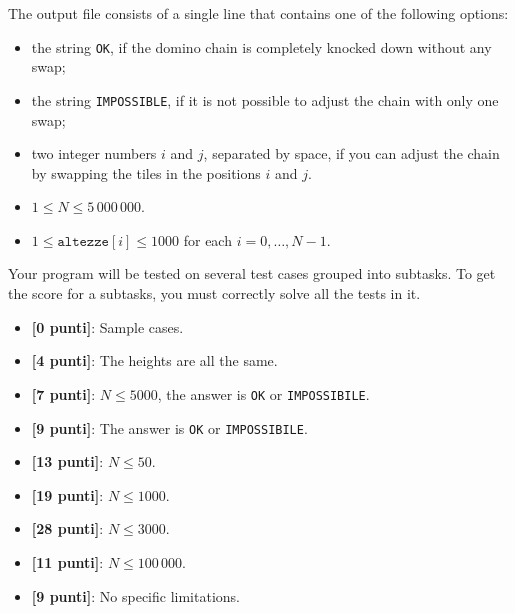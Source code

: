 The output file consists of a single line that contains one of the following options:
\begin{itemize}[nolistsep,itemsep=2mm]
\item the string \texttt{OK}, if the domino chain is completely knocked down without any swap;
\item the string \texttt{IMPOSSIBLE}, if it is not possible to adjust the chain with only one swap;
\item two integer numbers $i$ and $j$, separated by space,
  if you can adjust the chain by swapping the tiles in the positions $i$ and $j$.
\end{itemize}


\pagebreak
\Constraints

\begin{itemize}[nolistsep, itemsep=2mm]
	\item $1 \le N \le 5\,000\,000$.
	\item $1 \le \texttt{altezze}[i] \le 1000$ for each $i=0, \ldots, N-1$.
\end{itemize}



\Scoring

Your program will be tested on several test cases grouped into subtasks.
To get the score for a subtasks, you must correctly solve all the tests in it.

\begin{itemize}[nolistsep,itemsep=2mm]
  \item \textbf{ [\phantom{0}0 punti]}: Sample cases.
  \item \textbf{ [\phantom{0}4 punti]}: The heights are all the same.
  \item \textbf{ [\phantom{0}7 punti]}: $N \le 5000$, the answer is \texttt{OK} or \texttt{IMPOSSIBILE}.
  \item \textbf{ [\phantom{0}9 punti]}: The answer is \texttt{OK} or \texttt{IMPOSSIBILE}.
  \item \textbf{ [13 punti]}: $N \leq 50$.
  \item \textbf{ [19 punti]}: $N \leq 1000$.
  \item \textbf{ [28 punti]}: $N \leq 3000$.
  \item \textbf{ [11 punti]}: $N \leq 100\,000$.
  \item \textbf{ [\phantom{0}9 punti]}: No specific limitations.
\end{itemize}


